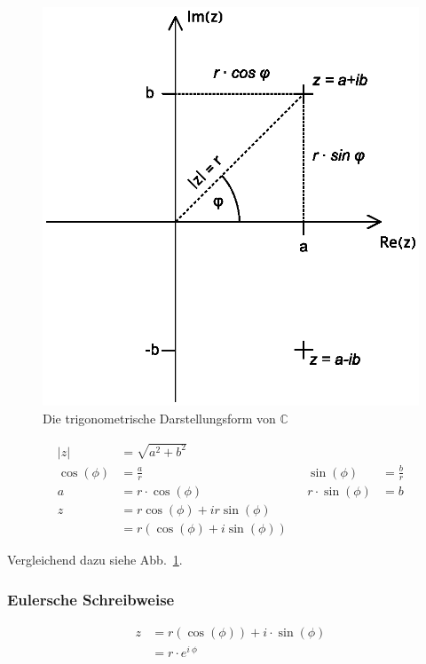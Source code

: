 \begin{figure}
	\centering
	\includegraphics[scale=0.5]{grafiken/Komplexe_Zahlen_Herleitung}
	\caption{Die trigonometrische Darstellungsform von \(\mathbb{C}\)}\label{fig:trigonometrische_form}
\end{figure}

\[
	\begin{alignedat}{3}
		\vert z \vert &=\sqrt{a^2+b^2} \\
		\cos(\phi) &= \frac{a}{r} && \sin(\phi) &= \frac{b}{r} \\
		a &= r \cdot \cos(\phi) && r \cdot \sin(\phi) &= b \\
		z &= r \cos(\phi) + i r \sin(\phi) \\
		&= r (\cos(\phi) + i \sin(\phi))
	\end{alignedat}
\]

Vergleichend dazu siehe Abb.~\ref{fig:trigonometrische_form}.

\subsubsection{Eulersche Schreibweise}


\begin{align*}
	z & = r (\cos(\phi)) + i \cdot \sin(\phi) \\
	  & = r \cdot e^{i\ \phi}                 
\end{align*}

